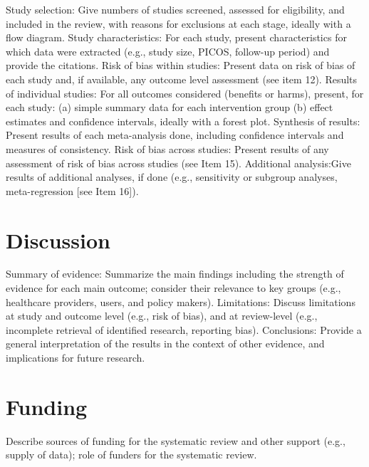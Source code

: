 \documentclass{article}\usepackage[]{graphicx}\usepackage[]{color}
\begin{document}
                Study selection: Give numbers of studies screened, assessed for eligibility, and included in the review, with reasons for exclusions at each stage, ideally with a flow diagram.
                Study characteristics: For each study, present characteristics for which data were extracted (e.g., study size, PICOS, follow-up period) and provide the citations.
                Risk of bias within studies: Present data on risk of bias of each study and, if available, any outcome level assessment (see item 12).
                Results of individual studies: For all outcomes considered (benefits or harms), present, for each study: (a) simple summary data for each intervention group (b) effect estimates and confidence intervals, ideally with a forest plot.
                Synthesis of results: Present results of each meta-analysis done, including confidence intervals and measures of consistency.
                Risk of bias across studies: Present results of any assessment of risk of bias across studies (see Item 15).
                Additional analysis:Give results of additional analyses, if done (e.g., sensitivity or subgroup analyses, meta-regression [see Item 16]).
                

\section{Discussion}

                Summary of evidence: Summarize the main findings including the strength of evidence for each main outcome; consider their relevance to key groups (e.g., healthcare providers, users, and policy makers).
                Limitations: Discuss limitations at study and outcome level (e.g., risk of bias), and at review-level (e.g., incomplete retrieval of identified research, reporting bias).
                Conclusions: Provide a general interpretation of the results in the context of other evidence, and implications for future research.
                

\section{Funding}

Describe sources of funding for the systematic review and other support (e.g., supply of data); role of funders for the systematic review.
                  
\end{document}
